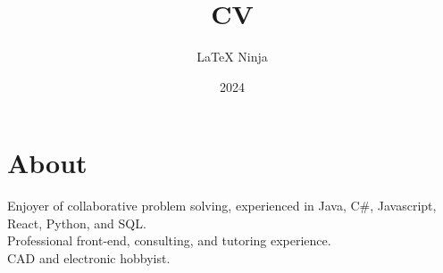 \documentclass[lighthipster]{simplehipstercv}
\title{CV}
\author{\LaTeX{} Ninja}
\date{2024}
\begin{document}
    
    
    \thispagestyle{empty}
    \vspace{5em}
    \small
    
    \begin{minipage}[t]{1\textwidth}
    \section*{About}
    Enjoyer of collaborative problem solving, experienced in Java, C\#, Javascript, React, Python, and SQL.\\
    Professional front-end, consulting, and tutoring experience.\\
    CAD and electronic hobbyist.
    \end{minipage}    
    \bigskip
\end{document}

